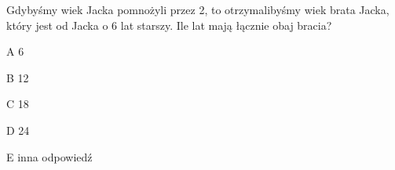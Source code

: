 \begin{tresc}
Gdybyśmy wiek Jacka pomnożyli przez 2, to otrzymalibyśmy wiek brata Jacka, który jest od Jacka o 6 lat starszy. Ile lat mają łącznie obaj bracia?
\end{tresc}
\begin{wariant}{A} 6 \end{wariant}
\begin{wariant}{B} 12 \end{wariant}
\begin{wariant}{C} 18 \end{wariant}
\begin{wariant}{D} 24 \end{wariant}
\begin{wariant}{E} inna odpowiedź \end{wariant}

